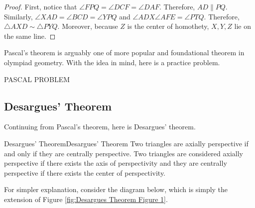 \documentclass[../../../main.tex]{subfiles}
\begin{document}
\begin{proof}
First, notice that $\angle{FPQ} = \angle{DCF} = \angle{DAF}$.
Therefore, $AD \parallel PQ$. Similarly, $\angle{XAD} = \angle{BCD}
= \angle{YPQ}$ and $\angle{ADX} \angle{AFE} = \angle{PTQ}$. Therefore,
$\triangle{AXD} \sim \triangle{PYQ}$. Moreover, because $Z$ is the
center of homothety, $X, Y, Z$ lie on the same line.
\end{proof}

Pascal's theorem is arguably one of more popular and foundational
theorem in olympiad geometry. With the idea in mind, here is a
practice problem.

\begin{problem}{}{}
PASCAL PROBLEM
\end{problem}



\subsection{Desargues' Theorem}

Continuing from Pascal's theorem, here is Desargues' theorem.

\begin{theorem}{Desargues' Theorem}{Desargues' Theorem}
Two triangles are axially perspective if and only if they are
centrally perspective. Two triangles are considered axially
perspective if there exists the axis of perspectivity and they are
centrally perspective if there exists the center of perspectivity.
\end{theorem}

For simpler explanation, consider the diagram below, which is simply
the extension of Figure \ref{fig:Desargues Theorem Figure 1}.
\end{document}
